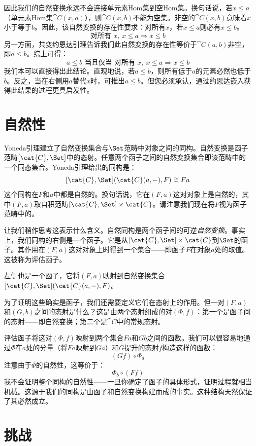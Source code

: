 因此我们的自然变换永远不会连接单元素Hom集到空Hom集。换句话说，若$x \leqslant a$（单元素Hom集$\cat{C}(x, a)$），则$\cat{C}(x, b)$不能为空集。非空的$\cat{C}(x, b)$意味着$x$小于等于$b$。因此，该自然变换的存在性要求：对所有$x$，若$x \leqslant a$则必有$x \leqslant b$。
$$\text{对所有 } x,\ x \leqslant a \Rightarrow x \leqslant b$$
另一方面，共变约恩达引理告诉我们此自然变换的存在性等价于$\cat{C}(a, b)$非空，即$a \leqslant b$。综上可得：
$$a \leqslant b \text{ 当且仅当 对所有 } x,\ x \leqslant a \Rightarrow x \leqslant b$$
我们本可以直接得出此结论。直观地说，若$a \leqslant b$，则所有低于$a$的元素必然也低于$b$。反之，当在右侧用$a$替代$x$时，可推出$a \leqslant b$。但您必须承认，通过约恩达嵌入获得此结果的过程更具启发性。

\section{自然性}

Yoneda引理建立了自然变换集合与$\Set$范畴中对象之间的同构。自然变换是函子范畴$[\cat{C}, \Set]$中的态射。任意两个函子之间的自然变换集合即该范畴中的一个同态集合。Yoneda引理给出的同构是：
$$[\cat{C}, \Set](\cat{C}(a, -), F) \cong F a$$
这个同构在$F$和$a$中都是自然的。换句话说，它在$(F, a)$这对对象上是自然的，其中$(F, a)$取自积范畴$[\cat{C}, \Set] \times \cat{C}$。请注意我们现在将$F$视为函子范畴中的。

让我们稍作思考这表示什么含义。自然同构是两个函子间的可逆\emph{自然变换}。事实上，我们同构的右侧是一个函子。它是从$[\cat{C}, \Set] \times \cat{C}$到$\Set$的函子。其作用在$(F, a)$这对对象上时得到一个集合——即函子$F$在对象$a$处的取值。这被称为评估函子。

左侧也是一个函子，它将$(F, a)$映射到自然变换集合$[\cat{C}, \Set](\cat{C}(a, -), F)$。

为了证明这些确实是函子，我们还需要定义它们在态射上的作用。但一对$(F, a)$和$(G, b)$之间的态射是什么？这是由两个态射组成的对$(\Phi, f)$：第一个是函子间的态射——即自然变换；第二个是$\cat{C}$中的常规态射。

评估函子将这对$(\Phi, f)$映射到两个集合$F a$和$G b$之间的函数。我们可以很容易地通过$\Phi$在$a$处的分量（将$F a$映射到$G a$）和$G$提升的态射$f$构造这样的函数：
$$(G f) \circ \Phi_a$$
注意由于$\Phi$的自然性，这等价于：
$$\Phi_b \circ (F f)$$
我不会证明整个同构的自然性——一旦你确定了函子的具体形式，证明过程就相当机械。这源于我们的同构是由函子和自然变换构建而成的事实。这种结构天然保证了其必然成立。

\section{挑战}

